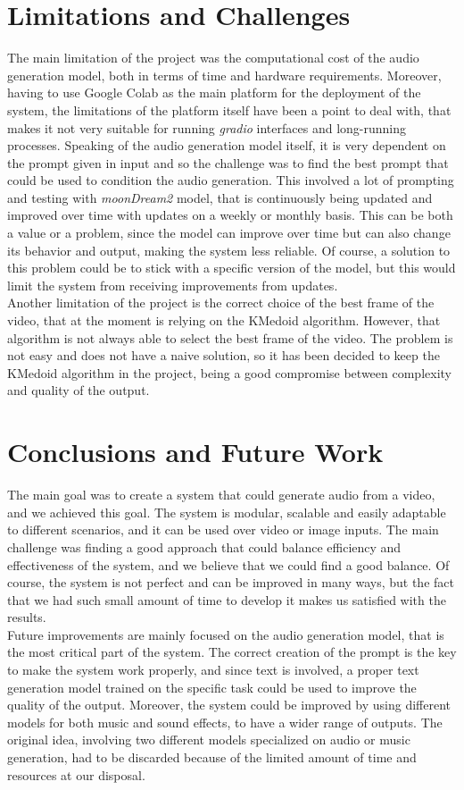 \documentclass[conference]{IEEEtran}
\begin{document}
\section{Limitations and Challenges}
The main limitation of the project was the computational cost of the audio generation model, both in terms of time and hardware requirements. 
Moreover, having to use Google Colab as the main platform for the deployment of the system, the limitations of the platform itself have been a point to deal with, that makes it not very suitable for running \textit{gradio} interfaces and long-running processes. 
Speaking of the audio generation model itself, it is very dependent on the prompt given in input and so the challenge was to find the best prompt that could be used to condition the audio generation.
This involved a lot of prompting and testing with \textit{moonDream2} model, that is continuously being updated and improved over time with updates on a weekly or monthly basis. This can be 
both a value or a problem, since the model can improve over time but can also change its behavior and output, making the system less reliable. Of course, a solution to this problem could be to stick with a specific version of the model, but this would limit the system from receiving improvements from updates.\\
Another limitation of the project is the correct choice of the best frame of the video, that at the moment is relying on the KMedoid algorithm. However, that algorithm is not always able to select the best frame of the video. 
The problem is not easy and does not have a naive solution, so it has been decided to keep the KMedoid algorithm in the project, being a good compromise between complexity and quality of the output.

\section{Conclusions and Future Work}
The main goal was to create a system that could generate audio from a video, and we achieved this goal. The system is modular, scalable and easily adaptable to different scenarios, and it can be used over video or image inputs. 
The main challenge was finding a good approach that could balance efficiency and effectiveness of the system, and we believe that we could find a good balance. Of course, the system is not perfect and can be improved in many ways, but the fact that we had such small amount of time to develop it makes us satisfied with the results.\\
Future improvements are mainly focused on the audio generation model, that is the most critical part of the system. The correct creation of the prompt is the key to make the system work properly, and since text is involved, a proper text generation model trained 
on the specific task could be used to improve the quality of the output. Moreover, the system could be improved by using different models for both music and sound effects, to have a wider range of outputs. The original idea, involving two different models specialized on audio or music generation, had to be discarded because of the limited amount of time and resources at our disposal.  
\end{document}
